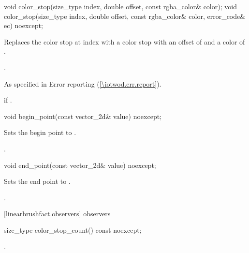 \begin{itemdecl}
void color_stop(size_type index, double offset,
  const rgba_color& color);
void color_stop(size_type index, double offset,
  const rgba_color& color, error_code& ec) noexcept;
\end{itemdecl}
\begin{itemdescr}
\pnum
\effects
Replaces the color stop at index  with a color stop with an offset of  and a color of .

\pnum
\postconditions
{}.

\pnum
\throws
As specified in Error reporting (\ref{\iotwod.err.report}).

\pnum
\errors
{} if .
\end{itemdescr}

\begin{itemdecl}
void begin_point(const vector_2d& value) noexcept;
\end{itemdecl}
\begin{itemdescr}
\pnum
\effects
Sets the begin point to .

\pnum
\postconditions
{}.
\end{itemdescr}

\begin{itemdecl}
void end_point(const vector_2d& value) noexcept;
\end{itemdecl}
\begin{itemdescr}
\pnum
\effects
Sets the end point to .

\pnum
\postconditions
{}.
\end{itemdescr}

 [linearbrushfact.observers] { observers}

\begin{itemdecl}
size_type color_stop_count() const noexcept;
\end{itemdecl}
\begin{itemdescr}
\pnum
\returns
{}.
\end{itemdescr}

